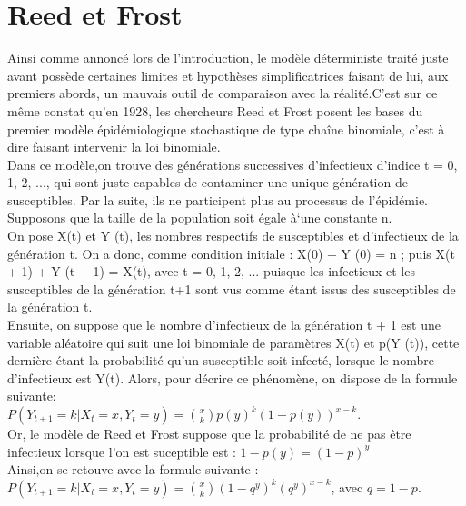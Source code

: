 \section{Reed et Frost}

Ainsi comme annoncé lors de l'introduction, le modèle déterministe traité juste avant possède certaines limites et hypothèses simplificatrices faisant de lui, aux premiers abords, un mauvais outil de comparaison avec la réalité.C'est sur ce même constat qu'en 1928, les chercheurs Reed et Frost posent les bases du premier modèle épidémiologique stochastique de type chaîne binomiale, c'est à dire faisant intervenir la loi binomiale.\\
Dans ce modèle,on trouve des générations successives d’infectieux d’indice t = 0, 1, 2, ..., qui sont juste capables de contaminer une unique génération de susceptibles. Par la suite, ils ne participent plus au processus de l’épidémie. Supposons que la taille de la population soit égale à`une constante n.\\
On pose  X(t) et Y (t), les nombres respectifs de susceptibles et d’infectieux de la génération t.
On a donc, comme condition initiale : X(0) + Y (0) = n ; puis  X(t + 1) + Y (t + 1) = X(t), avec t = 0, 1, 2, ... puisque les infectieux et les
susceptibles de la génération t+1 sont vus comme étant issus des susceptibles de la génération t.\\
Ensuite, on suppose que le nombre d’infectieux de la génération t + 1 est une variable aléatoire qui suit une loi binomiale de paramètres X(t) et p(Y (t)), cette dernière étant la probabilité qu’un susceptible soit infecté, lorsque le nombre d'infectieux est Y(t).
Alors, pour décrire ce phénomène, on dispose de la formule suivante:\\
$P(Y_{t+1} = k | X_t = x, Y_t = y)= \binom{x}{k}p(y)^{k} (1-p(y))^{x-k}$.\\
Or, le modèle de Reed et Frost suppose que la probabilité de ne pas être infectieux lorsque l'on est suceptible est :
$1-p(y) = (1-p)^{y}$\\
Ainsi,on se retouve avec la formule suivante :\\
$P(Y_{t+1} = k | X_t = x, Y_t = y)= \binom{x}{k}(1 - q^{y})^{k}(q^{y})^{x - k}$, avec $q=1-p$.\\


